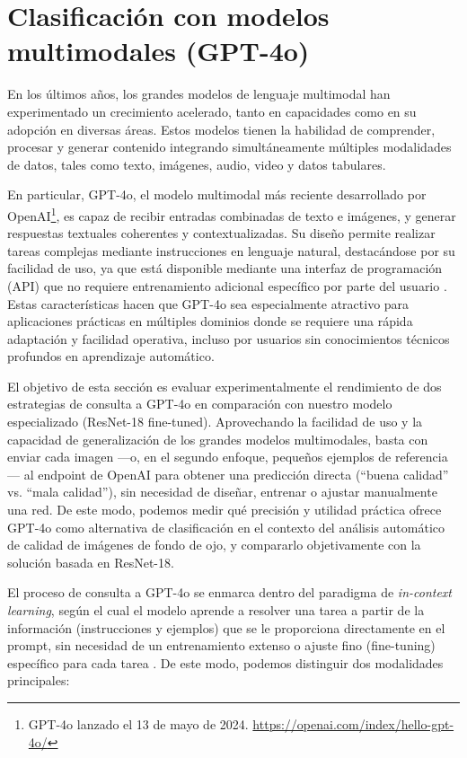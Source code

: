 \chapter{Clasificación con modelos multimodales (GPT-4o)}

En los últimos años, los grandes modelos de lenguaje multimodal han experimentado un crecimiento acelerado, tanto en capacidades como en su adopción en diversas áreas. Estos modelos tienen la habilidad de comprender, procesar y generar contenido integrando simultáneamente múltiples modalidades de datos, tales como texto, imágenes, audio, video y datos tabulares.

En particular, GPT-4o, el modelo multimodal más reciente desarrollado por OpenAI\footnote{GPT-4o lanzado el 13 de mayo de 2024. \url{https://openai.com/index/hello-gpt-4o/}}, es capaz de recibir entradas combinadas de texto e imágenes, y generar respuestas textuales coherentes y contextualizadas. Su diseño permite realizar tareas complejas mediante instrucciones en lenguaje natural, destacándose por su facilidad de uso, ya que está disponible mediante una interfaz de programación (API) que no requiere entrenamiento adicional específico por parte del usuario \parencites{openai2024gpt4o,shahriar2024gpt4o}. Estas características hacen que GPT-4o sea especialmente atractivo para aplicaciones prácticas en múltiples dominios donde se requiere una rápida adaptación y facilidad operativa, incluso por usuarios sin conocimientos técnicos profundos en aprendizaje automático.

El objetivo de esta sección es evaluar experimentalmente el rendimiento de dos estrategias de consulta a GPT-4o en comparación con nuestro modelo especializado (ResNet-18 fine-tuned). Aprovechando la facilidad de uso y la capacidad de generalización de los grandes modelos multimodales, basta con enviar cada imagen —o, en el segundo enfoque, pequeños ejemplos de referencia— al endpoint de OpenAI para obtener una predicción directa (“buena calidad” vs. “mala calidad”), sin necesidad de diseñar, entrenar o ajustar manualmente una red. De este modo, podemos medir qué precisión y utilidad práctica ofrece GPT-4o como alternativa de clasificación en el contexto del análisis automático de calidad de imágenes de fondo de ojo, y compararlo objetivamente con la solución basada en ResNet-18.

El proceso de consulta a GPT-4o se enmarca dentro del paradigma de \textit{in-context learning}, según el cual el modelo aprende a resolver una tarea a partir de la información (instrucciones y ejemplos) que se le proporciona directamente en el prompt, sin necesidad de un entrenamiento extenso o ajuste fino (fine-tuning) específico para cada tarea \parencites{chen2023gpt4vision}. De este modo, podemos distinguir dos modalidades principales:

